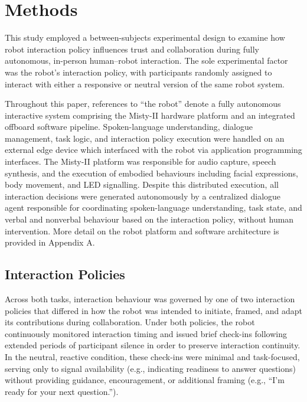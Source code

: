 \documentclass[
  letterpaper,
  DIV=11,
  numbers=noendperiod]{scrartcl}
\begin{document}
\section{Methods}\label{methods}

This study employed a between-subjects experimental design to examine
how robot interaction policy influences trust and collaboration during
fully autonomous, in-person human--robot interaction. The sole
experimental factor was the robot's interaction policy, with
participants randomly assigned to interact with either a responsive or
neutral version of the same robot system.

Throughout this paper, references to ``the robot'' denote a fully
autonomous interactive system comprising the Misty-II hardware platform
and an integrated offboard software pipeline. Spoken-language
understanding, dialogue management, task logic, and interaction policy
execution were handled on an external edge device which interfaced with
the robot via application programming interfaces. The Misty-II platform
was responsible for audio capture, speech synthesis, and the execution
of embodied behaviours including facial expressions, body movement, and
LED signalling. Despite this distributed execution, all interaction
decisions were generated autonomously by a centralized dialogue agent
responsible for coordinating spoken-language understanding, task state,
and verbal and nonverbal behaviour based on the interaction policy,
without human intervention. More detail on the robot platform and
software architecture is provided in Appendix A.

\subsection{Interaction Policies}\label{interaction-policies}

Across both tasks, interaction behaviour was governed by one of two
interaction policies that differed in how the robot was intended to
initiate, framed, and adapt its contributions during collaboration.
Under both policies, the robot continuously monitored interaction timing
and issued brief check-ins following extended periods of participant
silence in order to preserve interaction continuity. In the neutral,
reactive condition, these check-ins were minimal and task-focused,
serving only to signal availability (e.g., indicating readiness to
answer questions) without providing guidance, encouragement, or
additional framing (e.g., ``I'm ready for your next question.'').
\end{document}
